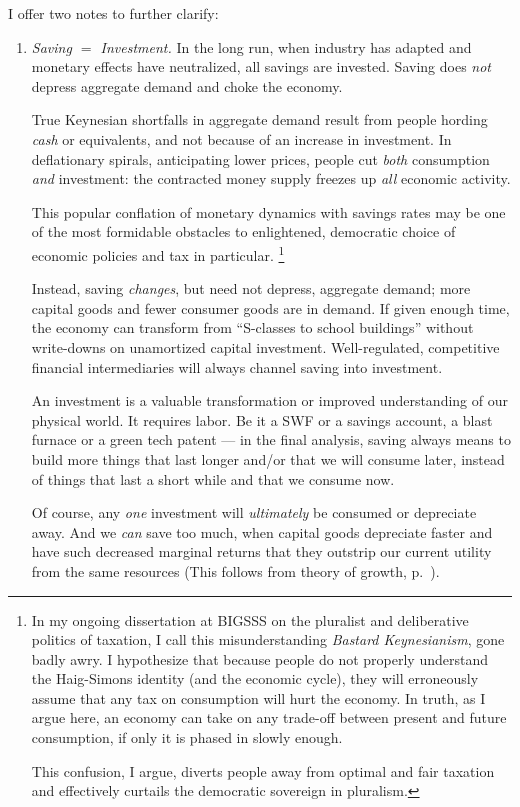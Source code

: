 I offer two notes to further clarify:
\begin{enumerate}
	\item \emph{Saving $=$ Investment.} In the long run, when industry has adapted and monetary effects have neutralized, all savings are invested.
Saving does \emph{not} depress aggregate demand and choke the economy.

	True Keynesian shortfalls in aggregate demand result from people hording \emph{cash} or equivalents, and not because of an increase in investment.
In deflationary spirals, anticipating lower prices, people cut \emph{both} consumption \emph{and} investment:
the contracted money supply freezes up \emph{all} economic activity.

	This popular conflation of monetary dynamics with savings rates may be one of the most formidable obstacles to enlightened, democratic choice of economic policies and tax in particular.
	\footnote{
		In my ongoing dissertation at \gls{BIGSSS} on the pluralist and deliberative politics of taxation, I call this misunderstanding \emph{Bastard Keynesianism}, gone badly awry.
		I hypothesize that because people do not properly understand the Haig-Simons identity (and the economic cycle), they will erroneously assume that any tax on consumption will hurt the economy.
		In truth, as I argue here, an economy can take on any trade-off between present and future consumption, if only it is phased in slowly enough.

		This confusion, I argue, diverts people away from optimal and fair taxation and effectively curtails the democratic sovereign in pluralism.
	}

	Instead, saving \emph{changes}, but need not depress, aggregate demand;
more capital goods and fewer consumer goods are in demand.
If given enough time, the economy can transform from ``S-classes to school buildings'' without write-downs on unamortized capital investment.
Well-regulated, competitive financial intermediaries will always channel saving into investment.

	An investment is a valuable transformation or improved understanding of our physical world.
It requires labor.
Be it a \gls{SWF} or a savings account, a blast furnace or a green tech patent --- in the final analysis, saving always means to build more things that last longer and/or that we will consume later, instead of things that last a short while and that we consume now.

	Of course, any \emph{one} investment will \emph{ultimately} be consumed or depreciate away.
And we \emph{can} save too much, when capital goods depreciate faster and have such decreased marginal returns that they outstrip our current utility from the same resources (This follows from \cite{Solow1956} theory of growth, p.~\pageref{sec:time}).


\end{enumerate}
